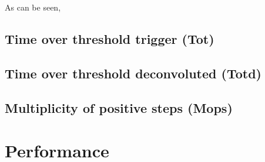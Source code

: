 As can be seen, 

\subsection{Time over threshold trigger (Tot)}
\label{ssec:time-over-threshold-trigger}

\subsection{Time over threshold deconvoluted (Totd)}
\label{ssec:time-over-threshold-deconvoluted}

\subsection{Multiplicity of positive steps (Mops)}
\label{ssec:multiplicity-of-positive-steps}



\section{Performance}
\label{sec:classical-triggers-performance}




